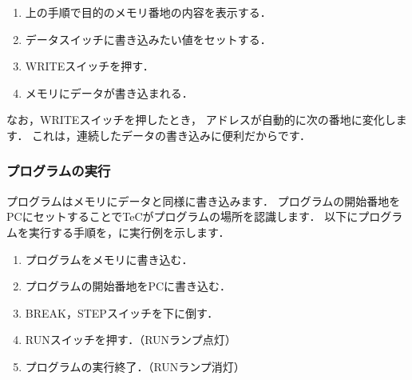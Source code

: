 \begin{enumerate}
\item 上の手順で目的のメモリ番地の内容を表示する．
\item データスイッチに書き込みたい値をセットする．
\item WRITEスイッチを押す．
\item メモリにデータが書き込まれる．
\end{enumerate}

なお，WRITEスイッチを押したとき，
アドレスが自動的に次の番地に変化します．
これは，連続したデータの書き込みに便利だからです．

\subsubsection{プログラムの実行}



プログラムはメモリにデータと同様に書き込みます．
プログラムの開始番地をPCにセットすることでTeCがプログラムの場所を認識します．
以下にプログラムを実行する手順を，に実行例を示します．

\begin{enumerate}
\item プログラムをメモリに書き込む．
\item プログラムの開始番地をPCに書き込む．
\item BREAK，STEPスイッチを下に倒す．
\item RUNスイッチを押す．（RUNランプ点灯）
\item プログラムの実行終了．（RUNランプ消灯）
\end{enumerate}

